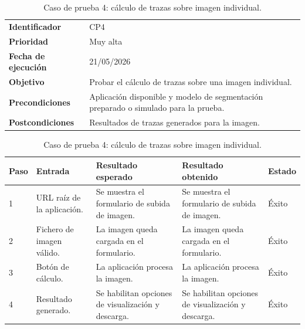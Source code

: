 \begin{table}[]
	\centering
	\footnotesize
	\renewcommand{\arraystretch}{1.2}
	\begin{tabularx}{\textwidth}{p{3.2cm} X}
		\toprule
		\textbf{Identificador} & CP4 \\
		\textbf{Prioridad} & Muy alta \\
		\textbf{Fecha de ejecución} & 21/05/2026 \\
		\textbf{Objetivo} & Probar el cálculo de trazas sobre una imagen individual. \\
		\textbf{Precondiciones} & Aplicación disponible y modelo de segmentación preparado o simulado para la prueba. \\
		\textbf{Postcondiciones} & Resultados de trazas generados para la imagen. \\
		\midrule
	\end{tabularx}
	\begin{tabularx}{\textwidth}{p{0.8cm} p{3.2cm} X X p{1.3cm}}
		\textbf{Paso} & \textbf{Entrada} & \textbf{Resultado esperado} & \textbf{Resultado obtenido} & \textbf{Estado} \\
		\midrule
		1 & URL raíz de la aplicación. & Se muestra el formulario de subida de imagen. & Se muestra el formulario de subida de imagen. & Éxito \\
		2 & Fichero de imagen válido. & La imagen queda cargada en el formulario. & La imagen queda cargada en el formulario. & Éxito \\
		3 & Botón de cálculo. & La aplicación procesa la imagen. & La aplicación procesa la imagen. & Éxito \\
		4 & Resultado generado. & Se habilitan opciones de visualización y descarga. & Se habilitan opciones de visualización y descarga. & Éxito \\
		\bottomrule
	\end{tabularx}
	\caption{Caso de prueba 4: cálculo de trazas sobre imagen individual.}
	\label{tab:cp4}
\end{table}

